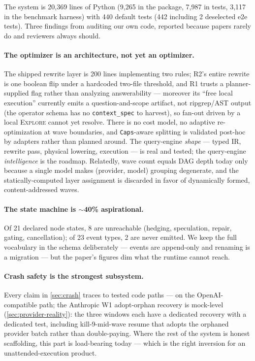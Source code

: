 \documentclass[11pt]{article}
\begin{document}
The system is 20{,}369 lines of Python (9{,}265 in the package, 7{,}987 in tests, 3{,}117 in the benchmark harness) with 440 default tests (442 including 2 deselected e2e tests). Three findings from auditing our own code, reported because papers rarely do and reviewers always should.

\paragraph{The optimizer is an architecture, not yet an optimizer.} The shipped rewrite layer is 200 lines implementing two rules; R2's entire rewrite is one boolean flip under a hardcoded two-file threshold, and R1 trusts a planner-supplied flag rather than analyzing answerability --- moreover its ``free local execution'' currently emits a question-and-scope artifact, not ripgrep/AST output (the operator schema has no \texttt{context\_spec} to harvest), so fan-out driven by a local \textsc{Explore} cannot yet resolve. There is no cost model, no adaptive re-optimization at wave boundaries, and \texttt{Caps}-aware splitting is validated post-hoc by adapters rather than planned around. The query-engine \emph{shape} --- typed IR, rewrite pass, physical lowering, execution --- is real and tested; the query-engine \emph{intelligence} is the roadmap. Relatedly, wave count equals DAG depth today only because a single model makes (provider, model) grouping degenerate, and the statically-computed layer assignment is discarded in favor of dynamically formed, content-addressed waves.

\paragraph{The state machine is $\sim$40\% aspirational.} Of 21 declared node states, 8 are unreachable (hedging, speculation, repair, gating, cancellation); of 23 event types, 2 are never emitted. We keep the full vocabulary in the schema deliberately --- events are append-only and renaming is a migration --- but the paper's figures dim what the runtime cannot reach.

\paragraph{Crash safety is the strongest subsystem.} Every claim in \cref{sec:crash} traces to tested code paths --- on the OpenAI-compatible path; the Anthropic W1 adopt-orphan recovery is mock-level (\cref{sec:provider-reality}): the three windows each have a dedicated recovery with a dedicated test, including kill-9-mid-wave resume that adopts the orphaned provider batch rather than double-paying. Where the rest of the system is honest scaffolding, this part is load-bearing today --- which is the right inversion for an unattended-execution product.
\end{document}

